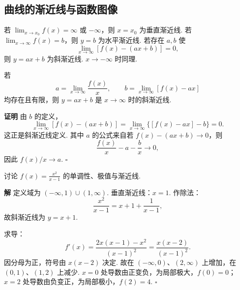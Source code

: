 \documentclass[fontset=fandol]{ctexart}
\newenvironment{proofdetail}{\par\noindent\textbf{证明}\quad}{\hfill$\square$\par\vspace{0.8em}}
\newenvironment{solution}{\par\noindent\textbf{解}\quad}{\hfill$\square$\par\vspace{0.8em}}
\begin{document}
\subsection{曲线的渐近线与函数图像}

\begin{definition}[渐近线]
若 $\lim_{x\to x_0}f(x)=\infty$ 或 $-\infty$，则 $x=x_0$ 为垂直渐近线. 若 $\lim_{x\to\infty}f(x)=b$，则 $y=b$ 为水平渐近线. 若存在 $a,b$ 使
\[
\lim_{x\to\infty}[f(x)-(ax+b)]=0,
\]
则 $y=ax+b$ 为斜渐近线. $x\to-\infty$ 时同理.
\end{definition}

\begin{center}
\end{center}

\begin{proposition}[斜渐近线求法]
若
\[
a=\lim_{x\to\infty}\frac{f(x)}{x},\qquad
b=\lim_{x\to\infty}[f(x)-ax]
\]
均存在且有限，则 $y=ax+b$ 是 $x\to\infty$ 时的斜渐近线.
\end{proposition}
\begin{proofdetail}
由 $b$ 的定义，
\[
\lim_{x\to\infty}[f(x)-(ax+b)]
=\lim_{x\to\infty}\{[f(x)-ax]-b\}=0.
\]
这正是斜渐近线定义. 其中 $a$ 的公式来自若 $f(x)-(ax+b)\to0$，则
\[
\frac{f(x)}x-a-\frac bx\to0,
\]
因此 $f(x)/x\to a$.
\end{proofdetail}

\begin{example}[完整图像分析]
讨论 $f(x)=\frac{x^2}{x-1}$ 的单调性、极值与渐近线.
\end{example}
\begin{solution}
定义域为 $(-\infty,1)\cup(1,\infty)$. 垂直渐近线：$x=1$.
作除法：
\[
\frac{x^2}{x-1}=x+1+\frac1{x-1},
\]
故斜渐近线为 $y=x+1$.

求导：
\[
f'(x)=\frac{2x(x-1)-x^2}{(x-1)^2}=\frac{x(x-2)}{(x-1)^2}.
\]
因分母为正，符号由 $x(x-2)$ 决定. 故在 $(-\infty,0)$、$(2,\infty)$ 上增加，在 $(0,1)$、$(1,2)$ 上减少. $x=0$ 处导数由正变负，为局部极大，$f(0)=0$；$x=2$ 处导数由负变正，为局部极小，$f(2)=4$.
\end{solution}
\end{document}
